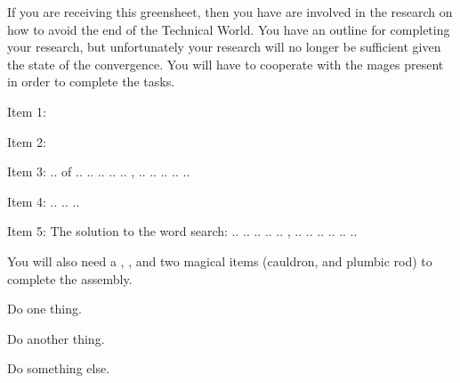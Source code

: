 \documentclass[green]{guildcamp3}
\begin{document}
\name{\gSaveTheWorldScientists{}}






If you are receiving this greensheet, then you have are involved in the research on how to avoid the end of the Technical World. You have an outline for completing your research, but unfortunately your research will no longer be sufficient given the state of the convergence. You will have to cooperate with the mages present in order to complete the tasks. 

Item 1:

Item 2:

Item 3: .. of .. .. .. .. ..  ,  .. .. .. .. ..

Item 4: .. .. .. 

Item 5: The solution to the word search: .. .. .. .. ..  ,  .. .. .. .. .. ..

You will also need a \iMultitool{}, \iScrewdriver{}, and two magical items (cauldron, and plumbic rod) to complete the assembly. 

\begin{enum}[Directions]
  \item Do one thing.
  \item Do another thing.
  \item Do something else.
\end{enum}
\end{document}
